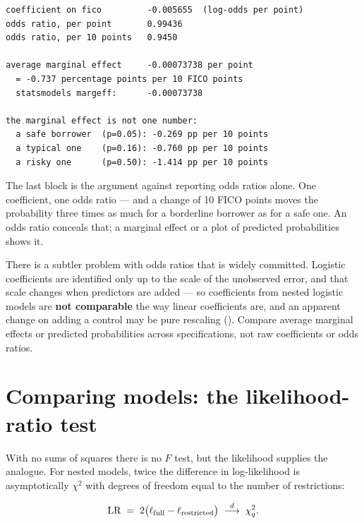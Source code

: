 \documentclass[
  letterpaper,
  10pt,
  twoside,
  openright,
  numbers=noenddot,
  chapterprefix=true]{scrbook}
\begin{document}
\begin{verbatim}
coefficient on fico         -0.005655  (log-odds per point)
odds ratio, per point       0.99436
odds ratio, per 10 points   0.9450

average marginal effect     -0.00073738 per point
  = -0.737 percentage points per 10 FICO points
  statsmodels margeff:      -0.00073738

the marginal effect is not one number:
  a safe borrower  (p=0.05): -0.269 pp per 10 points
  a typical one    (p=0.16): -0.760 pp per 10 points
  a risky one      (p=0.50): -1.414 pp per 10 points
\end{verbatim}

The last block is the argument against reporting odds ratios alone. One
coefficient, one odds ratio --- and a change of 10 FICO points moves the
probability three times as much for a borderline borrower as for a safe
one. An odds ratio conceals that; a marginal effect or a plot of
predicted probabilities shows it.

There is a subtler problem with odds ratios that is widely committed.
Logistic coefficients are identified only up to the scale of the
unobserved error, and that scale changes when predictors are added ---
so coefficients from nested logistic models are \textbf{not comparable}
the way linear coefficients are, and an apparent change on adding a
control may be pure rescaling ().
Compare average marginal effects or predicted probabilities across
specifications, not raw coefficients or odds ratios.

\section{Comparing models: the likelihood-ratio
test}\label{comparing-models-the-likelihood-ratio-test}

With no sums of squares there is no \(F\) test, but the likelihood
supplies the analogue. For nested models, twice the difference in
log-likelihood is asymptotically \(\chi^2\) with degrees of freedom
equal to the number of restrictions:

\[
\mathrm{LR} \thickspace=\thickspace 2\big(\ell_{\text{full}} - \ell_{\text{restricted}}\big)
\thickspace\overset{d}{\longrightarrow}\thickspace \chi^2_q .
\]
\end{document}
